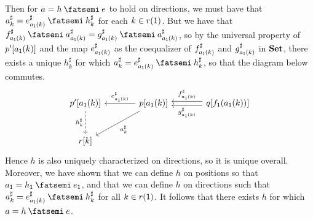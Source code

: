 \documentclass[Book-Poly]{subfiles}
\begin{document}
\begin{exercise}
\begin{solution}
\begin{enumerate}
    Then for $a = h \then e$ to hold on directions, we must have that $a^\sharp_k = e^\sharp_{a_\1(k)} \then h^\sharp_k$ for each $k \in r(\textsf{1})$.
    But we have that $f^\sharp_{a_\1(k)} \then a^\sharp_{a_\1(k)} = g^\sharp_{a_\1(k)} \then a^\sharp_{a_\1(k)}$, so by the universal property of $p'[a_{\textsf{1}}(k)]$ and the map $e^\sharp_{a_{\textsf{1}}(k)}$ as the coequalizer of $f^\sharp_{a_{\textsf{1}}(k)}$ and $g^\sharp_{a_{\textsf{1}}(k)}$ in $\mathbf{Set}$, there exists a unique $h^\sharp_k$ for which $a^\sharp_k = e^\sharp_{a_\1(k)} \then h^\sharp_k$, so that the diagram below commutes.
    \begin{equation*} %
    \begin{tikzcd}[sep=large]
        p'[a_\1(k)] \ar[d, "h^\sharp_k"', dashed] & p[a_\1(k)] \ar[l, "e^\sharp_{a_\1(k)}"'] \ar[dl, "a^\sharp_k"] & q[f_\1(a_\1(k))] \ar[l, "f^\sharp_{a_\1(k)}"', shift right] \ar[l, "g^\sharp_{a_\1(k)}", shift left] \\
        r[k]
    \end{tikzcd}
    \end{equation*}
    Hence $h$ is also uniquely characterized on directions, so it is unique overall.
    Moreover, we have shown that we can define $h$ on positions so that $a_\1 = h_\1 \then e_\1$, and that we can define $h$ on directions such that $a^\sharp_k = e^\sharp_{a_\1(k)} \then h^\sharp_k$ for all $k \in r(\textsf{1})$.
    It follows that there exists $h$ for which $a = h \then e$.
\end{enumerate}
\end{solution}
\end{exercise}
\end{document}

